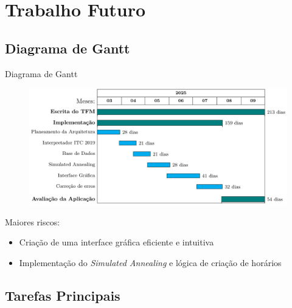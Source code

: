 \documentclass[aspectratio=169]{beamer}
\begin{document}
    \section{Trabalho Futuro}

    \subsection{Diagrama de Gantt}

    \begin{frame}{Diagrama de Gantt}
        \justifying

        \begin{figure}
            \includegraphics[width=.85\linewidth]{img/Diagrama-Gantt.png}
        \end{figure}

        \vfill

        Maiores riscos:
        \begin{itemize}
            \item Criação de uma interface gráfica eficiente e intuitiva
            \item Implementação do \textit{Simulated Annealing} e lógica de criação de horários
        \end{itemize}

        \vfill
    \end{frame}

    \subsection{Tarefas Principais}
\end{document}
